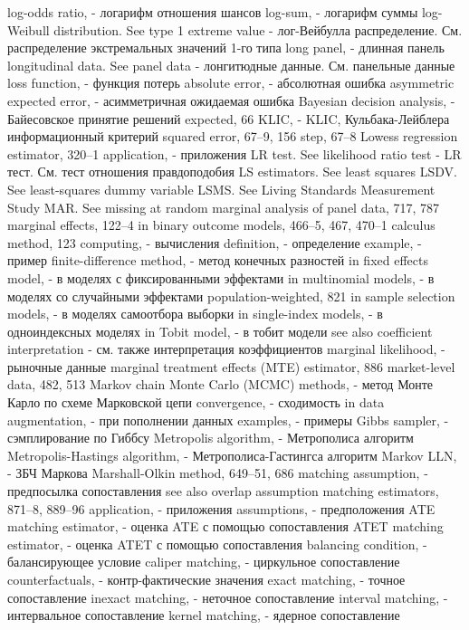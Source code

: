 log-odds ratio, - логарифм отношения шансов
log-sum, - логарифм суммы
log-Weibull distribution. See type 1 extreme value - лог-Вейбулла распределение. См. распределение экстремальных значений 1-го типа
long panel, - длинная панель
longitudinal data. See panel data - лонгитюдные данные. См. панельные данные
loss function, - функция потерь
absolute error, - абсолютная ошибка
asymmetric expected error, - асимметричная ожидаемая ошибка
Bayesian decision analysis, - Байесовское принятие решений
expected, 66
KLIC, - KLIC, Кульбака-Лейблера информационный критерий 
squared error, 67–9, 156
step, 67–8
Lowess regression estimator, 320–1 
application, - приложения
LR test. See likelihood ratio test - LR тест. См. тест отношения правдоподобия
LS estimators. See least squares
LSDV. See least-squares dummy variable
LSMS. See Living Standards Measurement Study
MAR. See missing at random
marginal analysis of panel data, 717, 787 marginal effects, 122–4
in binary outcome models, 466–5, 467, 470–1 calculus method, 123
computing, - вычисления
definition, - определение
example, - пример
finite-difference method, - метод конечных разностей
in fixed effects model, - в моделях с фиксированными эффектами
in multinomial models, - в моделях со случайными эффектами
population-weighted, 821
in sample selection models, - в моделях самоотбора выборки
in single-index models, - в одноиндексных моделях
in Tobit model, - в тобит модели
see also coefficient interpretation - см. также интерпретация коэффициентов
marginal likelihood, - рыночные данные
marginal treatment effects (MTE) estimator, 886 
market-level data, 482, 513
Markov chain Monte Carlo (MCMC) methods, - метод Монте Карло по схеме Марковской цепи
convergence, - сходимость
in data augmentation, - при пополнении данных
examples, - примеры
Gibbs sampler, - сэмплирование по Гиббсу 
Metropolis algorithm, - Метрополиса алгоритм 
Metropolis-Hastings algorithm, - Метрополиса-Гастингса алгоритм 
Markov LLN, - ЗБЧ Маркова 
Marshall-Olkin method, 649–51, 686 
matching assumption, - предпосылка сопоставления
see also overlap assumption matching estimators, 871–8, 889–96
application, - приложения
assumptions, - предположения
ATE matching estimator, - оценка ATE с помощью сопоставления
ATET matching estimator, - оценка ATET с помощью сопоставления
balancing condition, - балансирующее условие
caliper matching, - циркульное сопоставление
counterfactuals, - контр-фактические значения
exact matching, - точное сопоставление
inexact matching, - неточное сопоставление
interval matching, - интервальное сопоставление
kernel matching, - ядерное сопоставление

